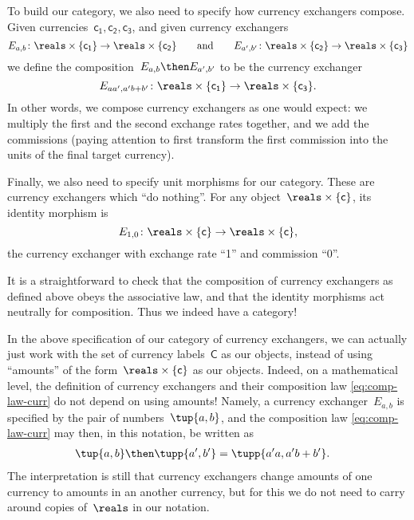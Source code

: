 To build our category, we also need to specify how currency exchangers compose. Given currencies~$\mathsf{c_1}, \mathsf{c_2}, \mathsf{c_3}$, and given currency exchangers
\begin{equation*}
    E_{a,b} \colon \reals \times \{\mathsf{c_1} \} \rightarrow \reals \times \{ \mathsf{c_2}\}
    \qquad \text{and} \qquad
    E_{a',b'} \colon \reals \times \{\mathsf{c_2}\} \rightarrow \reals \times \{\mathsf{c_3}\}
\end{equation*}
we define the composition~$E_{a,b} \then E_{a',b'}$ to be the currency exchanger
\begin{equation}
    \label{eq:comp-law-curr}
    E_{aa',a'b + b'} \colon \reals \times \{\mathsf{c_1}\} \rightarrow \reals \times \{\mathsf{c_3}\}.
\end{equation}
In other words, we compose currency exchangers as one would expect: we multiply the first and the second exchange rates together, and we add the commissions (paying attention to first transform the first commission into the units of the final target currency).

Finally, we also need to specify unit morphisms for our category. These are currency exchangers which ``do nothing''. For any object~$\reals \times \{ \mathsf{c}\}$, its identity morphism is
\begin{equation*}
    E_{1,0} \colon \reals \times \{\mathsf{c}\} \rightarrow \reals \times \{\mathsf{c}\},
\end{equation*}
the currency exchanger with exchange rate ``1'' and commission ``0''.

It is a straightforward to check that the composition of currency exchangers as defined above obeys the associative law, and that the identity morphisms act neutrally for composition. Thus we indeed have a category!

\begin{remark}
    In the above specification of our category of currency exchangers, we can actually just work with the set of currency labels~$\mathsf{C}$ as our objects, instead of using ``amounts'' of the form~$\reals \times \{\mathsf{c}\}$ as our objects. Indeed, on a mathematical level, the definition of currency exchangers and their composition law \cref{eq:comp-law-curr} do not depend on using amounts! Namely, a currency exchanger~$E_{a,b}$ is specified by the pair of numbers~$\tup{a, b}$, and the composition law \eqref{eq:comp-law-curr} may then, in this notation, be written as
    \begin{equation}
        \begin{aligned}
            \label{eq:currencycomp}
            \tup{a,b}\then \tupp{a',b'}&=\tupp{a' a, a' b + b'}.
        \end{aligned}
    \end{equation}
    The interpretation is still that currency exchangers change amounts of one currency to amounts in an another currency, but for this we do not need to carry around copies of~$\reals$ in our notation.
\end{remark}

